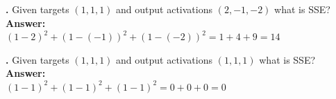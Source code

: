 \noindent
{}
{\bf \theSSECounter.}  Given targets $(1,1,1)$ and output activations $(2,-1,-2)$ what is SSE? \\
{\bf Answer:}  \\
$(1-2)^2 + (1- (-1))^2 + (1-(-2))^2 = 1 + 4 + 9 = 14$
\bigskip

\noindent
{}
{\bf \theSSECounter.}  Given targets $(1,1,1)$ and output activations $(1,1,1)$ what is SSE? \\
{\bf Answer:}  \\
$(1-1)^2 + (1-1)^2 + (1-1)^2 = 0 + 0 + 0 = 0$
\bigskip
